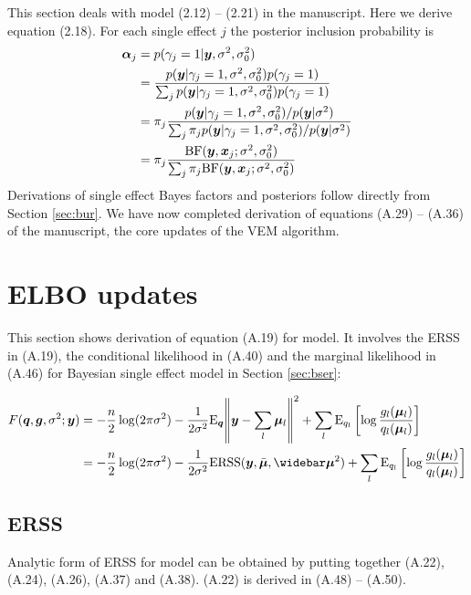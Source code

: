 This section deals with model (2.12) -- (2.21) in the manuscript. Here we derive equation (2.18). For each single effect $j$ the posterior inclusion probability is
\begin{align}
    \bm \alpha_j &= p(\gamma_j = 1 | \bm y, \sigma^2, \sigma^2_0) \\
    &= \frac{p(\bm y | \gamma_j = 1, \sigma^2, \sigma^2_0)p(\gamma_j=1)}{\sum_j p(\bm y | \gamma_j = 1, \sigma^2, \sigma^2_0)p(\gamma_j=1)} \\
    &= \pi_j \frac{p(\bm y | \gamma_j = 1, \sigma^2, \sigma^2_0) / p(\bm y|\sigma^2)}{\sum_j \pi_j p(\bm y | \gamma_j = 1, \sigma^2, \sigma^2_0) / p(\bm y | \sigma^2)} \\
    &= \pi_j \frac{\text{BF}(\bm y, \bm x_j; \sigma^2, \sigma^2_0)}{\sum_j \pi_j \text{BF}(\bm y, \bm x_j; \sigma^2, \sigma^2_0)}
\end{align}
Derivations of single effect Bayes factors and posteriors follow directly from Section \ref{sec:bur}. We have now completed derivation of equations (A.29) -- (A.36) of the manuscript, the core updates of the \susie VEM algorithm.

\section{ELBO updates}

This section shows derivation of equation (A.19) for \susie model. It involves the ERSS in (A.19), the conditional likelihood in (A.40) and the marginal likelihood in (A.46) for Bayesian single effect model in Section \ref{sec:bser}: 

\begin{align}
    F(\q,\g,\rv; \vy) &= -\frac{n}{2} \log(2\pi\rv) -\frac{1}{2\rv}\E_{\q}\norm{\vy-\sum_l \vmu_l}^2 + \sum_l \E_{q_l}\left[\log\frac{g_l(\vmu_l)}{q_l(\vmu_l)} \right] \label{eqn:Fexplicit}\\
    &= -\frac{n}{2} \log(2\pi\rv) - \frac{1}{2\rv} \ERSS(\vy,\emu,\emusq) + \sum_l \E_{q_l}\left[ \log\frac{g_l(\vmu_l)}{q_l(\vmu_l)} \right]  
\end{align}

\subsection{ERSS}

Analytic form of ERSS for \susie model can be obtained by putting together (A.22), (A.24), (A.26), (A.37) and (A.38). (A.22) is derived in (A.48) -- (A.50).

